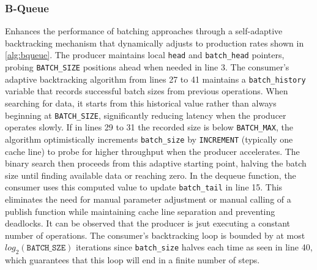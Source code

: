 \subsubsection{B-Queue}
Enhances the performance of batching approaches through a self-adaptive backtracking mechanism that dynamically adjusts to production rates shown in \cref{alg:bqueue}. The producer maintains local \texttt{head} and \texttt{batch\_head} pointers, probing \texttt{BATCH\_SIZE} positions ahead when needed in line 3. The consumer's adaptive backtracking algorithm from lines 27 to 41 maintains a \texttt{batch\_history} variable that records successful batch sizes from previous operations. When searching for data, it starts from this historical value rather than always beginning at \texttt{BATCH\_SIZE}, significantly reducing latency when the producer operates slowly. If in lines 29 to 31 the recorded size is below \texttt{BATCH\_MAX}, the algorithm optimistically increments \texttt{batch\_size} by \texttt{INCREMENT} (typically one cache line) to probe for higher throughput when the producer accelerates. The binary search then proceeds from this adaptive starting point, halving the batch size until finding available data or reaching zero. In the dequeue function, the consumer uses this computed value to update \texttt{batch\_tail} in line 15. This eliminates the need for manual parameter adjustment or manual calling of a publish function while maintaining cache line separation and preventing deadlocks. It can be observed that the producer is jsut executing a constant number of operations. The consumer's backtracking loop is bounded by at most $log_2(\texttt{BATCH_SZE})$ iterations since \texttt{batch\_size} halves each time as seen in line 40, which guarantees that this loop will end in a finite number of steps. \cite{Wang2013BQueue}

